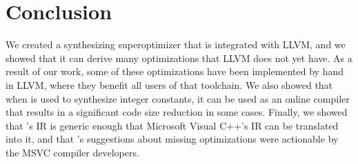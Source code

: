 \section{Conclusion}

We created a synthesizing superoptimizer that is integrated with LLVM,
and we showed that it can derive many optimizations that LLVM does not
yet have.
%
As a result of our work, some of these optimizations have been
implemented by hand in LLVM, where they benefit all users of that
toolchain.
%
We also showed that when \tool{} is used to synthesize integer
constants, it can be used as an online compiler that results in a
significant code size reduction in some cases.
%
Finally, we showed that \tool's IR is generic enough that Microsoft
Visual C++'s IR can be translated into it, and that \tool's
suggestions about missing optimizations were actionable by the MSVC
compiler developers.
